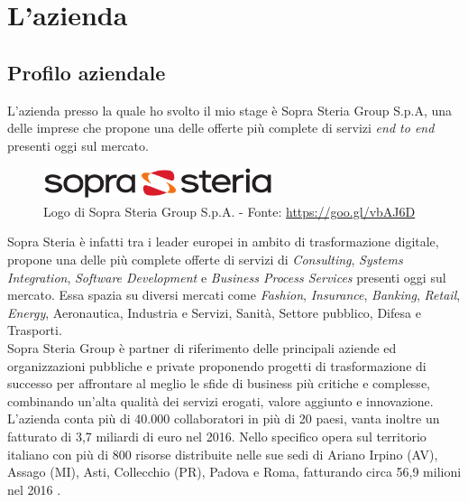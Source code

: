 

\chapter{L'azienda}

\section{Profilo aziendale}
L'azienda presso la quale ho svolto il mio stage è Sopra Steria Group S.p.A, una delle imprese che propone una delle offerte più complete di servizi \textit{end to end} presenti oggi sul mercato.\\

\begin{figure}[H]
	\centering
   	\includegraphics[width=0.6\textwidth]{immagini/logo_azienda}
   	\caption{Logo di Sopra Steria Group S.p.A. - Fonte: \url{https://goo.gl/vbAJ6D}}
\end{figure}

Sopra Steria è infatti tra i leader europei in ambito di trasformazione digitale, propone una delle più complete offerte di servizi di \textit{Consulting}, \textit{Systems Integration}, \textit{Software Development} e \textit{Business Process Services} presenti oggi sul mercato.
Essa spazia su diversi mercati come \textit{Fashion}, \textit{Insurance}, \textit{Banking}, \textit{Retail}, \textit{Energy}, Aeronautica, Industria e Servizi, Sanità, Settore pubblico, Difesa e Trasporti.\\

Sopra Steria Group è partner di riferimento delle principali aziende ed organizzazioni pubbliche e private proponendo progetti di trasformazione di successo per affrontare al meglio le sfide di business più critiche e complesse, combinando un'alta qualità dei servizi erogati, valore aggiunto e innovazione.\\

L'azienda conta più di 40.000 collaboratori in più di 20 paesi, vanta inoltre un fatturato di 3,7 miliardi di euro nel 2016. Nello specifico opera sul territorio italiano con più di 800 risorse distribuite nelle sue sedi di Ariano Irpino (AV), Assago (MI), Asti, Collecchio (PR), Padova e Roma, fatturando circa 56,9 milioni nel 2016 .\\


